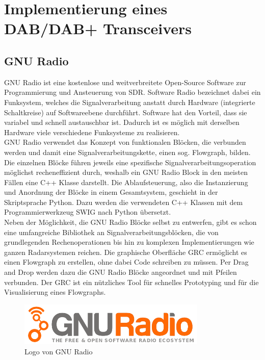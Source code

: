 \chapter{Implementierung eines DAB/DAB+ Transceivers}
\section{GNU Radio}
GNU Radio ist eine kostenlose und weitverbreitete Open-Source Software zur Programmierung und Ansteuerung von \ac{SDR}. Software Radio bezeichnet dabei ein Funksystem, welches die Signalverarbeitung anstatt durch Hardware (integrierte Schaltkreise) auf Softwareebene durchführt. Software hat den Vorteil, dass sie variabel und schnell austauschbar ist. Dadurch ist es möglich mit derselben Hardware viele verschiedene Funksysteme zu realisieren.\\
GNU Radio verwendet das Konzept von funktionalen Blöcken, die verbunden werden und damit eine Signalverarbeitungskette, einen sog. Flowgraph, bilden. Die einzelnen Blöcke führen jeweils eine spezifische Signalverarbeitungsoperation möglichst recheneffizient durch, weshalb ein GNU Radio Block in den meisten Fällen eine C++ Klasse darstellt. Die Ablaufsteuerung, also die Instanzierung und Anordnung der Blöcke in einem Gesamtsystem, geschieht in der Skriptsprache Python. Dazu werden die verwendeten C++ Klassen mit dem Programmierwerkzeug \ac{SWIG} nach Python übersetzt.\\
Neben der Möglichkeit, die GNU Radio Blöcke selbst zu entwerfen, gibt es schon eine umfangreiche Bibliothek an Signalverarbeitungsblöcken, die von grundlegenden Rechenoperationen bis hin zu komplexen Implementierungen wie ganzen Radarsystemen reichen. Die graphische Oberfläche \ac{GRC} ermöglicht es einen Flowgraph zu erstellen, ohne dabei Code schreiben zu müssen. Per Drag and Drop werden dazu die GNU Radio Blöcke angeordnet und mit Pfeilen verbunden. Der GRC ist ein nützliches Tool für schnelles Prototyping und für die Visualisierung eines Flowgraphs.\\

\begin{figure}[htb]
    \centering
    \includegraphics[width=0.8\textwidth]{figures/Gnuradio_logo.png}
    \caption{Logo von GNU Radio}
    \label{fig:gnu_radio_logo}
\end{figure}

